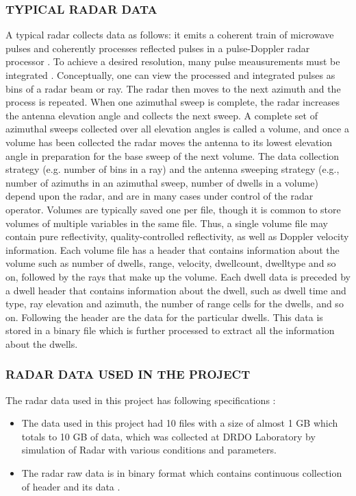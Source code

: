 \documentclass[14pt]{article} %
\begin{document}
\subsubsection{TYPICAL RADAR DATA}
A typical radar collects data as follows: it emits a coherent train of microwave pulses and coherently processes reflected pulses in a pulse-Doppler radar processor . To achieve a desired resolution, many pulse meausurements must be integrated . Conceptually, one can view the processed and integrated pulses as bins of a radar beam or ray. The radar then moves to the next azimuth and the process is repeated. When one azimuthal sweep is complete, the radar increases the antenna elevation angle and collects the next sweep. A complete set of azimuthal sweeps collected over all elevation angles is called a volume, and once a volume has been collected the radar moves the antenna to its lowest elevation angle in preparation for the base sweep of the next volume. The data collection strategy (e.g. number of bins in a ray) and the antenna sweeping strategy (e.g., number of azimuths in an azimuthal sweep, number of dwells in a volume) depend upon the radar, and are in many cases under control of the radar operator.  Volumes are typically saved one per file, though it is common to store volumes of multiple variables in the same file. Thus, a single volume file may contain pure reflectivity, quality-controlled reflectivity, as well as Doppler velocity information. Each volume file has a header that contains information about the volume such as  number of dwells, range, velocity, dwellcount, dwelltype and so on, followed by the rays that make up the volume. Each dwell data is preceded by a dwell header that contains information about the dwell, such as dwell time and type, ray elevation and azimuth, the number of range cells for the dwells, and so on. Following the header are the data for the particular dwells. This data is stored in a binary file which is further processed to extract all the information about the dwells.

\subsubsection{RADAR DATA USED IN THE PROJECT }
\noindent The radar data used in this project has following specifications :
\begin{itemize}
\item The data used in this project had 10 files with a size of almost 1 GB which totals to 10 GB of data, which was collected at DRDO Laboratory by simulation of Radar with various conditions and parameters.
 \item The radar raw data is in binary format which contains continuous collection of  header and its data .
 \end{itemize}
\end{document}
